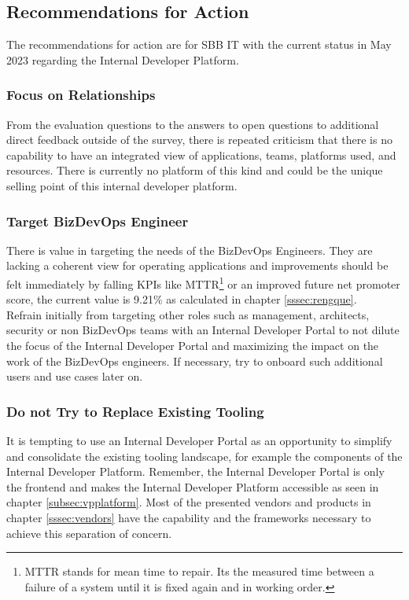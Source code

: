 \documentclass[a4paper,12pt]{article}
\begin{document}
    \subsection{Recommendations for Action}
    \label{subsec:arec}
    The recommendations for action are for SBB IT with the current status in May 2023 regarding the Internal Developer Platform.

    \subsubsection{Focus on Relationships}
    From the evaluation questions to the answers to open questions to additional direct feedback outside of the survey,
    there is repeated criticism that there is no capability to have an integrated view of applications, teams, platforms
    used, and resources.
    There is currently no platform of this kind and could be the unique selling point of this internal developer platform.

    \subsubsection{Target BizDevOps Engineer}
    There is value in targeting the needs of the BizDevOps Engineers.
    They are lacking a coherent view for operating applications and improvements should be felt immediately by falling
    KPIs like MTTR\footnote{MTTR stands for mean time to repair. Its the measured time between a failure of a system
    until it is fixed again and in working order.} or an improved future net promoter score, the current value is 9.21\%
    as calculated in chapter \ref{sssec:rengque}.\\
    Refrain initially from targeting other roles such as management, architects, security or non BizDevOps teams with
    an Internal Developer Portal to not dilute the focus of the Internal Developer Portal and maximizing the impact on
    the work of the BizDevOps engineers.
    If necessary, try to onboard such additional users and use cases later on.

    \subsubsection{Do not Try to Replace Existing Tooling}
    It is tempting to use an Internal Developer Portal as an opportunity to simplify and consolidate the existing tooling
    landscape, for example the components of the Internal Developer Platform.
    Remember, the Internal Developer Portal is only the frontend and makes the Internal Developer Platform accessible
    as seen in chapter \ref{subsec:vpplatform}.
    Most of the presented vendors and products in chapter \ref{sssec:vendors} have the capability and the frameworks
    necessary to achieve this separation of concern.
\end{document}
